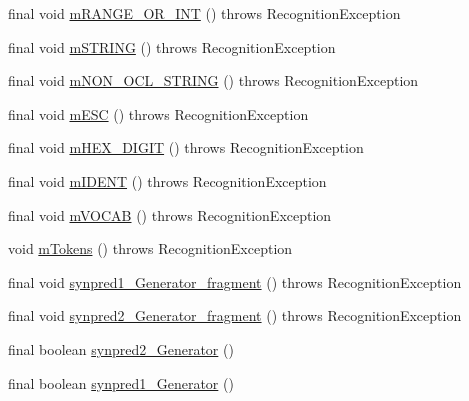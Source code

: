 \begin{DoxyCompactItemize}
\item 
final void \hyperlink{classorg_1_1tzi_1_1use_1_1parser_1_1generator_1_1_generator_lexer_a251a065eadeec2da285e9ccfd27c8596}{m\-R\-A\-N\-G\-E\-\_\-\-O\-R\-\_\-\-I\-N\-T} ()  throws Recognition\-Exception 
\item 
final void \hyperlink{classorg_1_1tzi_1_1use_1_1parser_1_1generator_1_1_generator_lexer_aacfd4cece2a7911fade27348d2bda2b9}{m\-S\-T\-R\-I\-N\-G} ()  throws Recognition\-Exception 
\item 
final void \hyperlink{classorg_1_1tzi_1_1use_1_1parser_1_1generator_1_1_generator_lexer_a105963836f1374c411b9d88d20dc9529}{m\-N\-O\-N\-\_\-\-O\-C\-L\-\_\-\-S\-T\-R\-I\-N\-G} ()  throws Recognition\-Exception 
\item 
final void \hyperlink{classorg_1_1tzi_1_1use_1_1parser_1_1generator_1_1_generator_lexer_a77e9b122871c53dfdc85cf3d06c8dff2}{m\-E\-S\-C} ()  throws Recognition\-Exception 
\item 
final void \hyperlink{classorg_1_1tzi_1_1use_1_1parser_1_1generator_1_1_generator_lexer_a1e34c68f2d076a048bd37f4b634dffa7}{m\-H\-E\-X\-\_\-\-D\-I\-G\-I\-T} ()  throws Recognition\-Exception 
\item 
final void \hyperlink{classorg_1_1tzi_1_1use_1_1parser_1_1generator_1_1_generator_lexer_a5d12db5456e161d45b6faa1e90d6b490}{m\-I\-D\-E\-N\-T} ()  throws Recognition\-Exception 
\item 
final void \hyperlink{classorg_1_1tzi_1_1use_1_1parser_1_1generator_1_1_generator_lexer_a5d85aa0be53ba79a61858819e19c361f}{m\-V\-O\-C\-A\-B} ()  throws Recognition\-Exception 
\item 
void \hyperlink{classorg_1_1tzi_1_1use_1_1parser_1_1generator_1_1_generator_lexer_aba8b17d41d82b028a876459bd1b0ef5b}{m\-Tokens} ()  throws Recognition\-Exception 
\item 
final void \hyperlink{classorg_1_1tzi_1_1use_1_1parser_1_1generator_1_1_generator_lexer_a3838289a06563fb570cd0c82bddef1a9}{synpred1\-\_\-\-Generator\-\_\-fragment} ()  throws Recognition\-Exception 
\item 
final void \hyperlink{classorg_1_1tzi_1_1use_1_1parser_1_1generator_1_1_generator_lexer_a5cb110e6e2ddd8ad5d6a5fea23286189}{synpred2\-\_\-\-Generator\-\_\-fragment} ()  throws Recognition\-Exception 
\item 
final boolean \hyperlink{classorg_1_1tzi_1_1use_1_1parser_1_1generator_1_1_generator_lexer_a6660612f85d52d8b6facf492548f8f2d}{synpred2\-\_\-\-Generator} ()
\item 
final boolean \hyperlink{classorg_1_1tzi_1_1use_1_1parser_1_1generator_1_1_generator_lexer_a7af4f05b2eaf57ba883ddfbd0ed77098}{synpred1\-\_\-\-Generator} ()
\end{DoxyCompactItemize}
